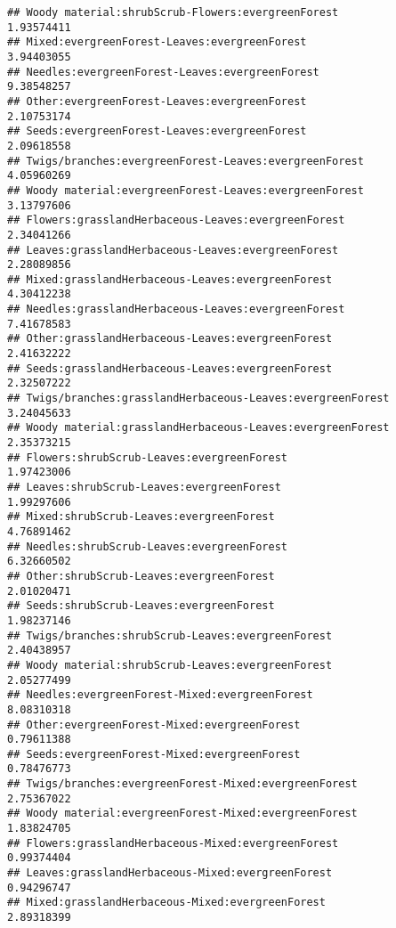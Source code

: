 \documentclass[
]{article}
\begin{document}
\begin{verbatim}
## Woody material:shrubScrub-Flowers:evergreenForest                      1.93574411
## Mixed:evergreenForest-Leaves:evergreenForest                           3.94403055
## Needles:evergreenForest-Leaves:evergreenForest                         9.38548257
## Other:evergreenForest-Leaves:evergreenForest                           2.10753174
## Seeds:evergreenForest-Leaves:evergreenForest                           2.09618558
## Twigs/branches:evergreenForest-Leaves:evergreenForest                  4.05960269
## Woody material:evergreenForest-Leaves:evergreenForest                  3.13797606
## Flowers:grasslandHerbaceous-Leaves:evergreenForest                     2.34041266
## Leaves:grasslandHerbaceous-Leaves:evergreenForest                      2.28089856
## Mixed:grasslandHerbaceous-Leaves:evergreenForest                       4.30412238
## Needles:grasslandHerbaceous-Leaves:evergreenForest                     7.41678583
## Other:grasslandHerbaceous-Leaves:evergreenForest                       2.41632222
## Seeds:grasslandHerbaceous-Leaves:evergreenForest                       2.32507222
## Twigs/branches:grasslandHerbaceous-Leaves:evergreenForest              3.24045633
## Woody material:grasslandHerbaceous-Leaves:evergreenForest              2.35373215
## Flowers:shrubScrub-Leaves:evergreenForest                              1.97423006
## Leaves:shrubScrub-Leaves:evergreenForest                               1.99297606
## Mixed:shrubScrub-Leaves:evergreenForest                                4.76891462
## Needles:shrubScrub-Leaves:evergreenForest                              6.32660502
## Other:shrubScrub-Leaves:evergreenForest                                2.01020471
## Seeds:shrubScrub-Leaves:evergreenForest                                1.98237146
## Twigs/branches:shrubScrub-Leaves:evergreenForest                       2.40438957
## Woody material:shrubScrub-Leaves:evergreenForest                       2.05277499
## Needles:evergreenForest-Mixed:evergreenForest                          8.08310318
## Other:evergreenForest-Mixed:evergreenForest                            0.79611388
## Seeds:evergreenForest-Mixed:evergreenForest                            0.78476773
## Twigs/branches:evergreenForest-Mixed:evergreenForest                   2.75367022
## Woody material:evergreenForest-Mixed:evergreenForest                   1.83824705
## Flowers:grasslandHerbaceous-Mixed:evergreenForest                      0.99374404
## Leaves:grasslandHerbaceous-Mixed:evergreenForest                       0.94296747
## Mixed:grasslandHerbaceous-Mixed:evergreenForest                        2.89318399

\end{verbatim}
\end{document}
